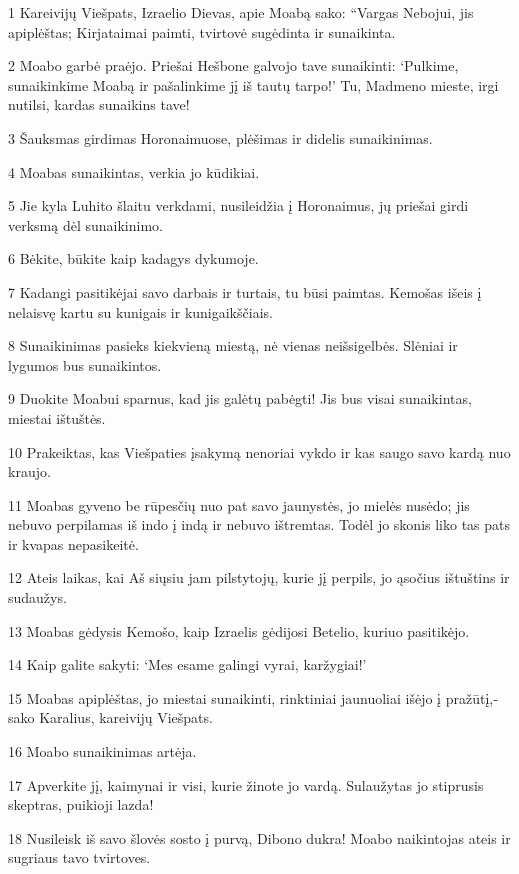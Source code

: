 \par 1 Kareivijų Viešpats, Izraelio Dievas, apie Moabą sako: “Vargas Nebojui, jis apiplėštas; Kirjataimai paimti, tvirtovė sugėdinta ir sunaikinta. 
\par 2 Moabo garbė praėjo. Priešai Hešbone galvojo tave sunaikinti: ‘Pulkime, sunaikinkime Moabą ir pašalinkime jį iš tautų tarpo!’ Tu, Madmeno mieste, irgi nutilsi, kardas sunaikins tave! 
\par 3 Šauksmas girdimas Horonaimuose, plėšimas ir didelis sunaikinimas. 
\par 4 Moabas sunaikintas, verkia jo kūdikiai. 
\par 5 Jie kyla Luhito šlaitu verkdami, nusileidžia į Horonaimus, jų priešai girdi verksmą dėl sunaikinimo. 
\par 6 Bėkite, būkite kaip kadagys dykumoje. 
\par 7 Kadangi pasitikėjai savo darbais ir turtais, tu būsi paimtas. Kemošas išeis į nelaisvę kartu su kunigais ir kunigaikščiais. 
\par 8 Sunaikinimas pasieks kiekvieną miestą, nė vienas neišsigelbės. Slėniai ir lygumos bus sunaikintos. 
\par 9 Duokite Moabui sparnus, kad jis galėtų pabėgti! Jis bus visai sunaikintas, miestai ištuštės. 
\par 10 Prakeiktas, kas Viešpaties įsakymą nenoriai vykdo ir kas saugo savo kardą nuo kraujo. 
\par 11 Moabas gyveno be rūpesčių nuo pat savo jaunystės, jo mielės nusėdo; jis nebuvo perpilamas iš indo į indą ir nebuvo ištremtas. Todėl jo skonis liko tas pats ir kvapas nepasikeitė. 
\par 12 Ateis laikas, kai Aš siųsiu jam pilstytojų, kurie jį perpils, jo ąsočius ištuštins ir sudaužys. 
\par 13 Moabas gėdysis Kemošo, kaip Izraelis gėdijosi Betelio, kuriuo pasitikėjo. 
\par 14 Kaip galite sakyti: ‘Mes esame galingi vyrai, karžygiai!’ 
\par 15 Moabas apiplėštas, jo miestai sunaikinti, rinktiniai jaunuoliai išėjo į pražūtį,­sako Karalius, kareivijų Viešpats.­ 
\par 16 Moabo sunaikinimas artėja. 
\par 17 Apverkite jį, kaimynai ir visi, kurie žinote jo vardą. Sulaužytas jo stiprusis skeptras, puikioji lazda! 
\par 18 Nusileisk iš savo šlovės sosto į purvą, Dibono dukra! Moabo naikintojas ateis ir sugriaus tavo tvirtoves. 
